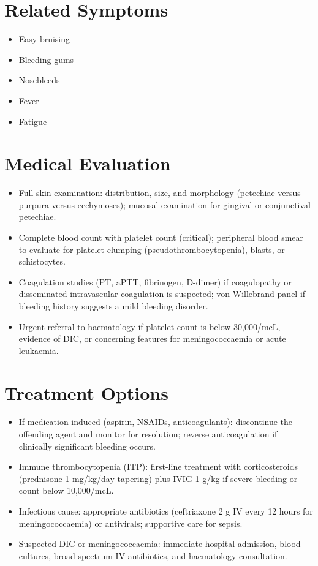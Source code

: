 \section*{Related Symptoms}
\begin{itemize}
  \item Easy bruising
  \item Bleeding gums
  \item Nosebleeds
  \item Fever
  \item Fatigue
\end{itemize}


\section*{Medical Evaluation}
\begin{itemize}
  \item Full skin examination: distribution, size, and morphology (petechiae versus purpura versus ecchymoses); mucosal examination for gingival or conjunctival petechiae.
  \item Complete blood count with platelet count (critical); peripheral blood smear to evaluate for platelet clumping (pseudothrombocytopenia), blasts, or schistocytes.
  \item Coagulation studies (PT, aPTT, fibrinogen, D-dimer) if coagulopathy or disseminated intravascular coagulation is suspected; von Willebrand panel if bleeding history suggests a mild bleeding disorder.
  \item Urgent referral to haematology if platelet count is below 30,000/mcL, evidence of DIC, or concerning features for meningococcaemia or acute leukaemia.
\end{itemize}

\section*{Treatment Options}
\begin{itemize}
  \item If medication-induced (aspirin, NSAIDs, anticoagulants): discontinue the offending agent and monitor for resolution; reverse anticoagulation if clinically significant bleeding occurs.
  \item Immune thrombocytopenia (ITP): first-line treatment with corticosteroids (prednisone 1 mg/kg/day tapering) plus IVIG 1 g/kg if severe bleeding or count below 10,000/mcL.
  \item Infectious cause: appropriate antibiotics (ceftriaxone 2 g IV every 12 hours for meningococcaemia) or antivirals; supportive care for sepsis.
  \item Suspected DIC or meningococcaemia: immediate hospital admission, blood cultures, broad-spectrum IV antibiotics, and haematology consultation.
\end{itemize}

